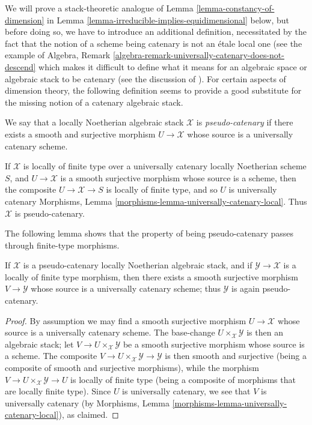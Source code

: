 \noindent
We will prove a stack-theoretic analogue
of Lemma \ref{lemma-constancy-of-dimension}
in Lemma \ref{lemma-irreducible-implies-equidimensional} below,
but before doing so, we have to introduce an additional definition,
necessitated by the fact that the notion of a scheme being catenary
is not an \'etale local one
(see the example of
Algebra, Remark \ref{algebra-remark-universally-catenary-does-not-descend}
which makes it difficult to define what it means for an algebraic
space or algebraic stack to be catenary
(see the discussion of \cite[page 3]{Osserman}).
For certain aspects of dimension theory, the following
definition seems to provide a good substitute for the missing
notion of a catenary algebraic stack.

\begin{definition}
\label{definition-pseudo-catenary}
We say that a locally Noetherian algebraic stack $\mathcal{X}$
is {\it pseudo-catenary} if there exists a smooth
and surjective morphism $U \to \mathcal{X}$ whose source is
a universally catenary scheme.
\end{definition}

\begin{example}
\label{example-pseudo-catenary}
If $\mathcal{X}$ is locally of finite type over a universally
catenary locally Noetherian scheme $S$,
and $U\to \mathcal{X}$ is a smooth surjective morphism
whose source is a scheme, then the composite
$U \to \mathcal{X} \to S$ is locally of finite type,
and so $U$ is universally catenary
Morphisms, Lemma
\ref{morphisms-lemma-universally-catenary-local}.
Thus $\mathcal{X}$ is pseudo-catenary.
\end{example}

\noindent
The following lemma shows that the property of being pseudo-catenary
passes through finite-type morphisms.

\begin{lemma}
\label{lemma-catenary-covers}
If $\mathcal{X}$ is a pseudo-catenary locally Noetherian algebraic
stack, and if $\mathcal{Y} \to \mathcal{X}$ is a locally of finite type
morphism,
then there exists a smooth surjective morphism $V \to \mathcal{Y}$
whose source is a universally catenary scheme; thus
$\mathcal{Y}$ is again pseudo-catenary.
\end{lemma}

\begin{proof}
By assumption we may find a smooth surjective morphism
$U \to \mathcal{X}$ whose source is a universally catenary scheme.
The base-change $U\times_{\mathcal{X}} \mathcal{Y}$ is then an algebraic
stack; let $V \to U\times_{\mathcal{X}} \mathcal{Y}$ be a smooth
surjective morphism whose source is a scheme.
The composite $V \to U\times_{\mathcal{X}} \mathcal{Y} \to \mathcal{Y}$ is then
smooth and surjective (being a composite of smooth and
surjective morphisms), while the morphism $V \to U\times_{\mathcal{X}}
\mathcal{Y} \to U$ is locally of finite type (being a composite
of morphisms that are locally finite type).  Since $U$
is universally catenary, we see that $V$ is universally catenary
(by Morphisms, Lemma
\ref{morphisms-lemma-universally-catenary-local}),
as claimed.
\end{proof}

